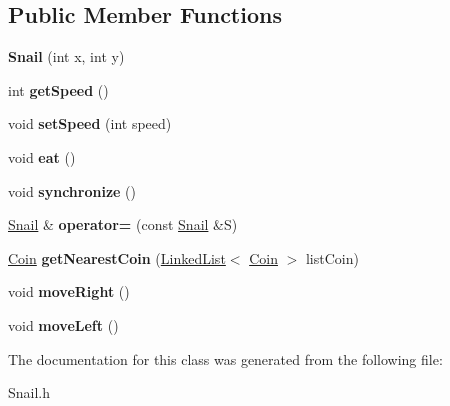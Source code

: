 \subsection*{Public Member Functions}
\begin{DoxyCompactItemize}
\item 
\mbox{\label{class_snail_af705248e170d76970fe23ac2e5fd2dcd}} 
{\bfseries Snail} (int x, int y)
\item 
\mbox{\label{class_snail_aa1ef66b01bf704babd6004d2fa42aeb1}} 
int {\bfseries get\+Speed} ()
\item 
\mbox{\label{class_snail_ab3d472ef9c58dc37a068c34dcee9d355}} 
void {\bfseries set\+Speed} (int speed)
\item 
\mbox{\label{class_snail_af1d3b378b87936ff924b28223648401c}} 
void {\bfseries eat} ()
\item 
\mbox{\label{class_snail_a4c9682f1fc8ac82f98d56de6c8044fbd}} 
void {\bfseries synchronize} ()
\item 
\mbox{\label{class_snail_a5fd9dc10de8c086659cbc223552f15d8}} 
\mbox{\hyperlink{class_snail}{Snail}} \& {\bfseries operator=} (const \mbox{\hyperlink{class_snail}{Snail}} \&S)
\item 
\mbox{\label{class_snail_a934cb74e9bc80fa462d59a03b5e0c5f4}} 
\mbox{\hyperlink{class_coin}{Coin}} {\bfseries get\+Nearest\+Coin} (\mbox{\hyperlink{class_linked_list}{Linked\+List}}$<$ \mbox{\hyperlink{class_coin}{Coin}} $>$ list\+Coin)
\item 
\mbox{\label{class_snail_acb846d48ca1ed10f2051b155fe50f100}} 
void {\bfseries move\+Right} ()
\item 
\mbox{\label{class_snail_a061780e0fe57eeb0861b6b7cc442bf92}} 
void {\bfseries move\+Left} ()
\end{DoxyCompactItemize}


The documentation for this class was generated from the following file\+:\begin{DoxyCompactItemize}
\item 
Snail.\+h\end{DoxyCompactItemize}
